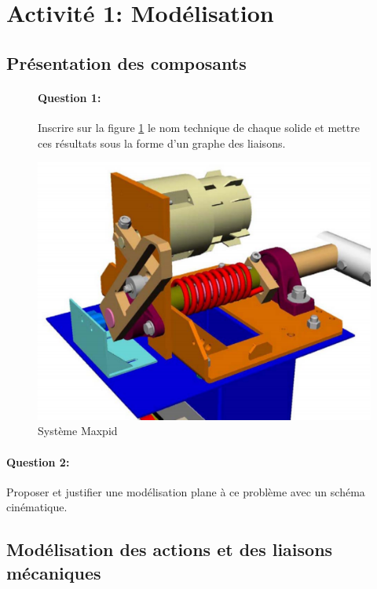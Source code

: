 

\section{Activité 1: Modélisation}

\subsection{Présentation des composants}

\begin{figure}[!h]
 \begin{minipage}{0.45\linewidth}
\paragraph{Question 1:} Inscrire sur la figure \ref{img1} le nom technique de chaque solide et mettre ces résultats sous la forme d'un graphe des liaisons.
 \end{minipage}
  \hfill
 \begin{minipage}{0.45\linewidth}
  \centering\includegraphics[width=0.7\linewidth]{img/barriere_int.png}
  \caption{Système Maxpid}
  \label{img1}
 \end{minipage}
\end{figure}

\paragraph{Question 2:} Proposer et justifier une modélisation plane à ce problème avec un schéma cinématique.

\vspace{6cm}

\subsection{Modélisation des actions et des liaisons mécaniques}

